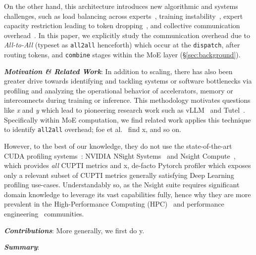 \documentclass[acmsmall,screen,review,anonymous]{acmart}
\begin{document}
On the other hand, this architecture introduces new algorithmic and systems challenges,
such as load balancing across experts~\cite{ShazeerMMDLHD17}, training instability~\cite{NEURIPS2022_3e67e84a},
expert capacity restriction leading to token dropping~\cite{gale2022megablocks},
and collective communication overhead~\cite{DBLP:journals/corr/abs-2006-16668}.
In this paper, we explicitly study the communication overhead due to \emph{All-to-All} (typeset as \verb|all2all|
henceforth) which occur at the \verb|dispatch|, after routing tokens, and \verb|combine| stages within the MoE layer
(\S \ref{sec:background}).

\textbf{\emph{Motivation \& Related Work}}: In addition to scaling, there has also been greater drive towards
identifying and tackling systems or software bottlenecks via profiling and analyzing the operational behavior of
accelerators, memory or interconnects during training or inference.
This methodology motivates questions like \emph{x} and \emph{y} which lead to pioneering research work
such as vLLM~\cite{kwon2023efficient} and Tutel~\cite{hwang2023tutel}.
Specifically within MoE computation, we find related work applies this technique to identify \verb|all2all| overhead;
foe et al.~\cite{10.1145/3603269.3604869} find x, and so on.

However, to the best of our knowledge, they do not use the state-of-the-art CUDA profiling systems~\cite{10.1145/3578244.3583736}:
NVIDIA NSight Systems~\cite{nsys} and Nsight Compute~\cite{ncu}, which provides \emph{all} CUPTI metrics and x,
de-facto Pytorch profiler\cite{} which exposes only a relevant subset of CUPTI metrics generally satisfying Deep Learning profiling use-cases.
Understandably so, as the Nsight suite requires significant domain knowledge to leverage its vast capabilities fully,
hence why they are more prevalent in the High-Performance Computing (HPC)~\cite{} and performance engineering~\cite{10.1145/3578244.3583736} communities.

\textbf{\emph{Contributions}}: More generally, we first do y.

\textbf{\emph{Summary}}:
\end{document}
